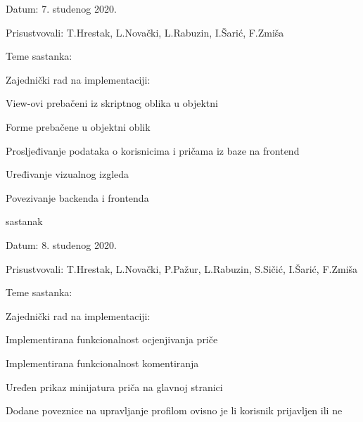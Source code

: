 \begin{packed_enum}
	\item[] \begin{packed_item}
		\item Datum: 7. studenog 2020.
		\item Prisustvovali: T.Hrestak, L.Novački, L.Rabuzin, I.Šarić, F.Zmiša
		\item Teme sastanka:
		\begin{packed_item}
			\item Zajednički rad na implementaciji:
			\begin{packed_item}
				\item  View-ovi prebačeni iz skriptnog oblika u objektni
				\item  Forme prebačene u objektni oblik
				\item  Prosljeđivanje podataka o korisnicima i pričama iz baze na frontend
				\item  Uređivanje vizualnog izgleda
				\item  Povezivanje backenda i frontenda
			\end{packed_item}
		\end{packed_item}
		
	\end{packed_item}

	\item sastanak

	\item[] \begin{packed_item}
		\item Datum: 8. studenog 2020.
		\item Prisustvovali: T.Hrestak, L.Novački, P.Pažur, L.Rabuzin, S.Sičić, I.Šarić, F.Zmiša
		\item Teme sastanka:
		\begin{packed_item}
			\item Zajednički rad na implementaciji:
			\begin{packed_item}
				\item  Implementirana funkcionalnost ocjenjivanja priče
				\item  Implementirana funkcionalnost komentiranja
				\item  Uređen prikaz minijatura priča na glavnoj stranici
				\item  Dodane poveznice na upravljanje profilom ovisno je li korisnik prijavljen ili ne
			\end{packed_item}
		\end{packed_item}
		
	\end{packed_item}
			
			
		\end{packed_enum}
		
